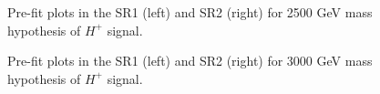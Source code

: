 \begin{figure}[H]
  \centering
  \caption{Pre-fit plots in the SR1 (left) and SR2 (right) for 2500 GeV mass hypothesis of $H^{+}$ signal.}
  \label{fig:Prefit_Hp2500_Asimov}
\end{figure}
\begin{figure}[H]
  \centering
  \caption{Pre-fit plots in the SR1 (left) and SR2 (right) for 3000 GeV mass hypothesis of $H^{+}$ signal.}
  \label{fig:Prefit_Hp3000_Asimov}
\end{figure}

